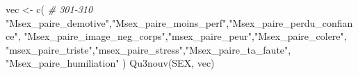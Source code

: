 \documentclass[
]{article}
\newenvironment{Shaded}{\begin{snugshade}}{\end{snugshade}}
\newcommand{\CommentTok}[1]{\textcolor[rgb]{0.56,0.35,0.01}{\textit{#1}}}
\newcommand{\FunctionTok}[1]{\textcolor[rgb]{0.00,0.00,0.00}{#1}}
\newcommand{\NormalTok}[1]{#1}
\newcommand{\OtherTok}[1]{\textcolor[rgb]{0.56,0.35,0.01}{#1}}
\newcommand{\StringTok}[1]{\textcolor[rgb]{0.31,0.60,0.02}{#1}}
\begin{document}
\begin{Shaded}
\begin{Highlighting}[]
\NormalTok{vec }\OtherTok{\textless{}{-}} \FunctionTok{c}\NormalTok{(   }\CommentTok{\# 301{-}310}
  \StringTok{"Msex\_paire\_demotive"}\NormalTok{,}\StringTok{"Msex\_paire\_moins\_perf"}\NormalTok{,}\StringTok{"Msex\_paire\_perdu\_confiance"}\NormalTok{,}
  \StringTok{"Msex\_paire\_image\_neg\_corps"}\NormalTok{,}\StringTok{"msex\_paire\_peur"}\NormalTok{,}\StringTok{"Msex\_paire\_colere"}\NormalTok{,}
  \StringTok{"msex\_paire\_triste"}\NormalTok{,}\StringTok{"msex\_paire\_stress"}\NormalTok{,}\StringTok{"Msex\_paire\_ta\_faute"}\NormalTok{,}
  \StringTok{"Msex\_paire\_humiliation"}
\NormalTok{  )}
\FunctionTok{Qu3nouv}\NormalTok{(SEX, vec)}
\end{Highlighting}
\end{Shaded}
\end{document}
